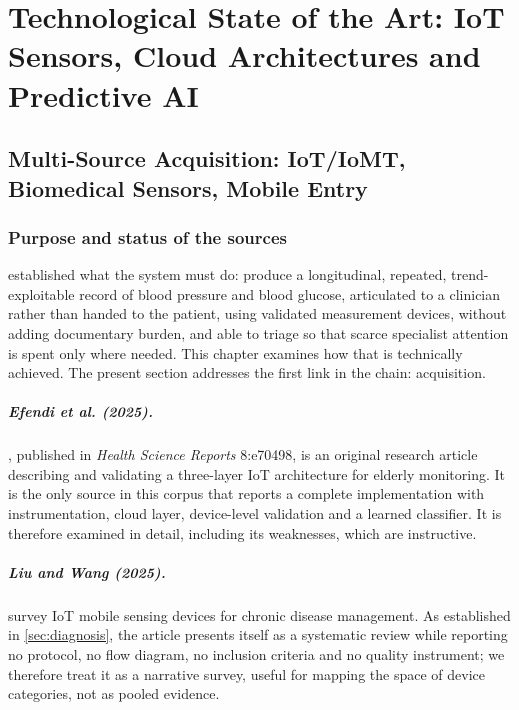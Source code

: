 \documentclass[12pt,a4paper,oneside]{report}
\begin{document}
\chapter{Technological State of the Art: IoT Sensors, Cloud Architectures and Predictive AI}\label{ch:techsota}

\section{Multi-Source Acquisition: IoT/IoMT, Biomedical Sensors, Mobile Entry}\label{sec:acquisition}

\subsection*{Purpose and status of the sources}

 established what the system must do: produce a longitudinal, repeated, trend-exploitable record of blood pressure and blood glucose, articulated to a clinician rather than handed to the patient, using validated measurement devices, without adding documentary burden, and able to triage so that scarce specialist attention is spent only where needed. This chapter examines how that is technically achieved. The present section addresses the first link in the chain: acquisition.

\paragraph{Efendi et al. (2025).} \textcite{efendi2025}, published in \emph{Health Science Reports} 8:e70498, is an original research article describing and validating a three-layer IoT architecture for elderly monitoring. It is the only source in this corpus that reports a complete implementation with instrumentation, cloud layer, device-level validation and a learned classifier. It is therefore examined in detail, including its weaknesses, which are instructive.

\paragraph{Liu and Wang (2025).} \textcite{liu2025review} survey IoT mobile sensing devices for chronic disease management. As established in \cref{sec:diagnosis}, the article presents itself as a systematic review while reporting no protocol, no flow diagram, no inclusion criteria and no quality instrument; we therefore treat it as a narrative survey, useful for mapping the space of device categories, not as pooled evidence.
\end{document}
